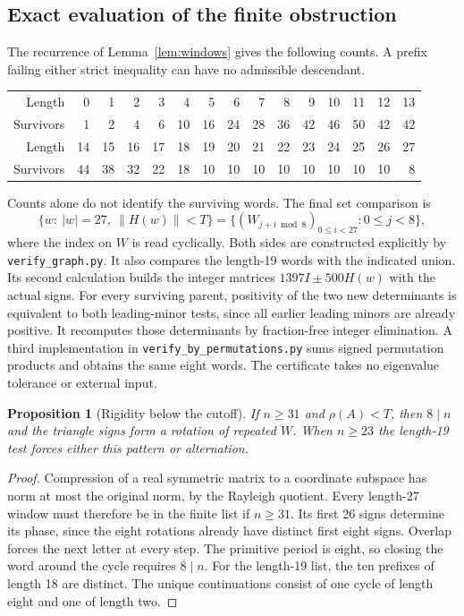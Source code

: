 \documentclass[11pt,letterpaper]{article}
\newtheorem{proposition}[theorem]{Proposition}\newtheorem{corollary}[theorem]{Corollary}
\newcommand{\code}[1]{{\small\texttt{#1}}}
\begin{document}
\subsection*{Exact evaluation of the finite obstruction}
The recurrence of Lemma~\ref{lem:windows} gives the following counts. A prefix failing either strict inequality can have no admissible descendant.
\begin{center}\small
\begin{tabular}{r|rrrrrrrrrrrrrr}
\toprule
Length &0&1&2&3&4&5&6&7&8&9&10&11&12&13\\
Survivors &1&2&4&6&10&16&24&28&36&42&46&50&42&42\\
\midrule
Length &14&15&16&17&18&19&20&21&22&23&24&25&26&27\\
Survivors &44&38&32&22&18&10&10&10&10&10&10&10&10&8\\
\bottomrule
\end{tabular}
\end{center}
Counts alone do not identify the surviving words. The final set comparison is
\[
  \{w:\ |w|=27,\ \|H(w)\|<T\}
   =\bigl\{(W_{j+i\bmod 8})_{0\le i<27}:0\le j<8\bigr\},
\]
where the index on $W$ is read cyclically. Both sides are constructed explicitly by \code{verify\_graph.py}. It also compares the length-19 words with the indicated union. Its second calculation builds the integer matrices $1397I\pm500H(w)$ with the actual signs. For every surviving parent, positivity of the two new determinants is equivalent to both leading-minor tests, since all earlier leading minors are already positive. It recomputes those determinants by fraction-free integer elimination. A third implementation in \code{verify\_by\_permutations.py} sums signed permutation products and obtains the same eight words. The certificate takes no eigenvalue tolerance or external input.

\begin{proposition}[Rigidity below the cutoff]\label{prop:rigidity}
If $n\ge31$ and $\rho(A)<T$, then $8\mid n$ and the triangle signs form a rotation of repeated $W$. When $n\ge23$ the length-19 test forces either this pattern or alternation.
\end{proposition}
\begin{proof}
Compression of a real symmetric matrix to a coordinate subspace has norm at most the original norm, by the Rayleigh quotient. Every length-27 window must therefore be in the finite list if $n\ge31$. Its first 26 signs determine its phase, since the eight rotations already have distinct first eight signs. Overlap forces the next letter at every step. The primitive period is eight, so closing the word around the cycle requires $8\mid n$. For the length-19 list, the ten prefixes of length 18 are distinct. The unique continuations consist of one cycle of length eight and one of length two.
\end{proof}
\end{document}
